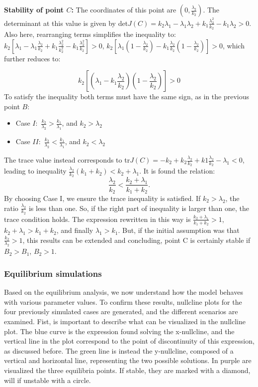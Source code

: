 \textbf{Stability of point $C$:} The coordinates of this point are $(0, \frac{\lambda_2}{k_2})$. The determinant at this value is given by det$J(C) = k_2 \lambda_1 - \lambda_1 \lambda_2 + k_1 \frac{\lambda_2^2}{k_2} - k_1 \lambda_2 > 0 $. Also here, rearranging terms simplifies the inequality to: $k_2 [\lambda_1 -\lambda_1 \frac{\lambda_2}{k_2} + k_1 \frac{\lambda_2^2}{k_2^2} - k_1 \frac{\lambda_2^2}{k_2}] >0$, $ k_2 [\lambda_1 ( 1 -  \frac{\lambda_2}{k_2}) - k_1 \frac{\lambda_2}{k_2} (1 - \frac{\lambda_2}{k_2})] >0$, which further reduces to:

\[
 k_2 [(\lambda_1 - k_1 \frac{\lambda_2}{k_2})(1 - \frac{\lambda_2}{k_2})] >0
\]
To satisfy the inequality both terms must have the same sign, as in the previous point $B$:
\begin{itemize}
	\item Case $I:$ $\frac{k_2}{\lambda_2} > \frac{k_1}{\lambda_1} $, and $k_2 > \lambda_2$
 	\item Case $II:$ $\frac{k_2}{\lambda_2} < \frac{k_1}{\lambda_1} $, and $k_2 < \lambda_2$
\end{itemize}
The trace value instead corresponds to tr$J(C) = - k_2 + k_2 \frac{\lambda_2}{k_2} + k1 \frac{\lambda_2}{k_2} - \lambda_1 < 0$, leading to inequality 
$ \frac{\lambda_2}{k_2} (k_1 + k_2) < k_2 + \lambda_1 $. It is found the relation:
\[ \frac{\lambda_2}{k_2} < \frac{k_2 +\lambda_1}{k_1 + k_2}.\]
By choosing Case I, we ensure the trace inequality is satisfied. If $k_2 > \lambda_2$, the ratio $\frac{\lambda_2}{k_2}$ is less than one. So, if the right part of inequality is larger than one, the trace condition holds. The expression rewritten in this way is $\frac{k_2 +\lambda_1}{k_1 + k_2} > 1$, $k_2 +\lambda_1 > k_1 + k_2 $, and finally $\lambda_1 > k_1$. But, if the initial assumption was that $ \frac{k_2 }{\lambda_2} > 1$, this results can be extended and concluding, point C is certainly stable if $B_2> B_1$, $B_2 > 1$.  
 
\subsubsection{Equilibrium simulations}

Based on the equilibrium analysis, we now understand how the model behaves with various parameter values. To confirm these results, nullcline plots for the four previously simulated cases are generated, and the different scenarios are examined. Fist, is important to describe what can be visualized in the nullcline plot. The blue curve is the expression found solving the x-nullcline, and the vertical line in the plot correspond to the point of discontinuity of this expression, as discussed before. The green line is instead the y-nullcline, composed of a vertical and horizontal line, representing the two possible solutions. In purple are visualized the three equilibria points. If stable, they are marked with a diamond, will if unstable with a circle.  
\\

